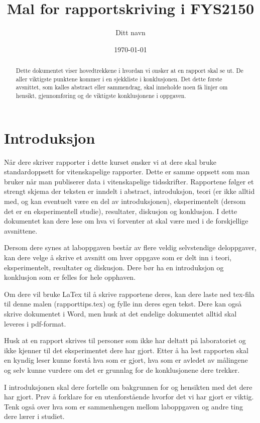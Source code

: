 \documentclass[norsk,a4paper,12pt]{article}
\title{Mal for rapportskriving i FYS2150}
\author{Ditt navn}
\date{\today}
\begin{document}
\maketitle

\begin{abstract}
Dette dokumentet viser hovedtrekkene i hvordan vi ønsker at en rapport skal se ut. De aller viktigste punktene kommer i en sjekkliste i konklusjonen. 
Det dette første avsnittet, som kalles abstract eller sammendrag, skal inneholde noen få linjer om hensikt, gjennomføring og de viktigste konklusjonene i oppgaven.
\end{abstract}

\section{Introduksjon}
Når dere skriver rapporter i dette kurset ønsker vi at dere skal bruke standardoppsett for vitenskapelige rapporter. Dette er samme oppsett som man bruker når man publiserer data i vitenskapelige tidsskrifter. Rapportene følger et strengt skjema der teksten er inndelt i abstract, introduksjon, teori (er ikke alltid med, og kan eventuelt være en del av introduksjonen), eksperimentelt (dersom det er en eksperimentell studie), resultater, diskusjon og konklusjon. I dette dokumentet kan dere lese om hva vi forventer at skal være med i de forskjellige avsnittene. 

Dersom dere synes at laboppgaven består av flere veldig selvstendige deloppgaver, kan dere velge å skrive et avsnitt om hver oppgave som er delt inn i teori, eksperimentelt, resultater og diskusjon. Dere bør ha en introduksjon og konklusjon som er felles for hele opphaven. 

Om dere vil bruke LaTex til å skrive rapportene deres, kan dere laste ned tex-fila til denne malen (rapporttips.tex) og fylle inn deres egen tekst. Dere kan også skrive dokumentet i Word, men husk at det endelige dokumentet alltid skal leveres i pdf-format. 

Husk at en rapport skrives til personer som ikke har deltatt på laboratoriet og ikke kjenner til det eksperimentet dere har gjort. Etter å ha lest rapporten skal en kyndig leser kunne forstå hva som er gjort, hva som er avledet av målingene og selv kunne vurdere om det er grunnlag for de konklusjonene dere trekker.

I introduksjonen skal dere fortelle om bakgrunnen for og hensikten med det dere har gjort. Prøv å forklare for en utenforstående hvorfor det vi har gjort er viktig. Tenk også over hva som er sammenhengen mellom laboppgaven og andre ting dere lærer i studiet.
\end{document}
